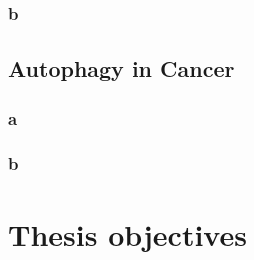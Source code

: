         \subsubsection{b}


        
        
        
        
        
    \subsection{Autophagy in Cancer}
        \subsubsection{a}
        \subsubsection{b}
        
        
        


\section{Thesis objectives}

